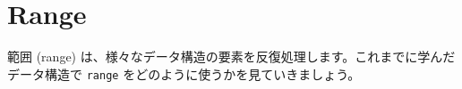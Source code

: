 \section{Range}

範囲 (range) は、様々なデータ構造の要素を反復処理します。これまでに学んだデータ構造で \texttt{range} をどのように使うかを見ていきましょう。




